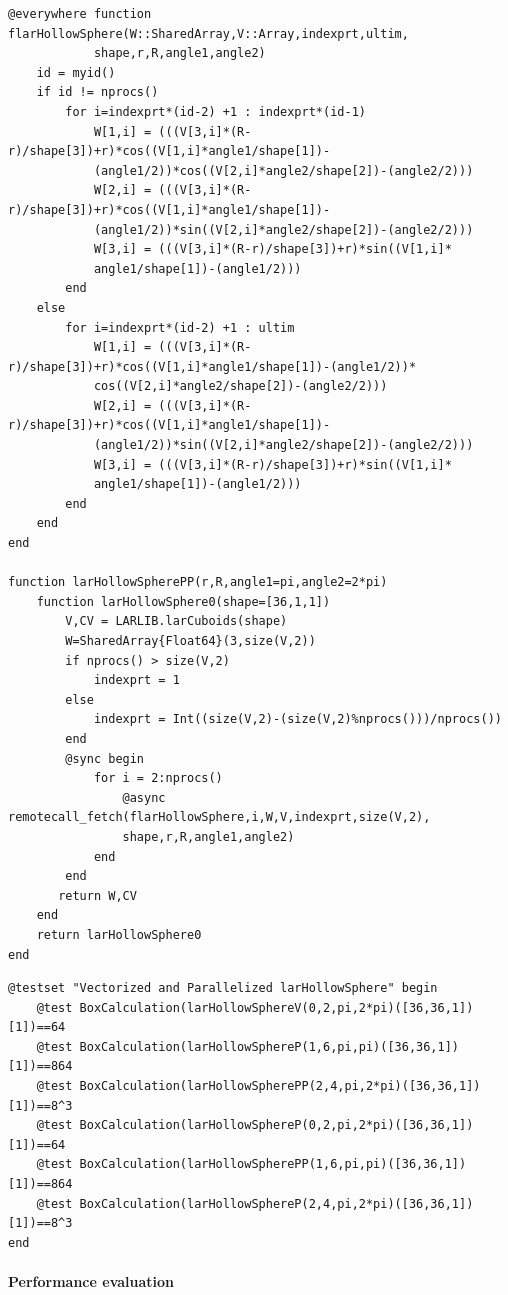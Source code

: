 \documentclass{article}
\begin{document}
\begin{Verbatim}
@everywhere function flarHollowSphere(W::SharedArray,V::Array,indexprt,ultim,
            shape,r,R,angle1,angle2)
    id = myid()
    if id != nprocs()
        for i=indexprt*(id-2) +1 : indexprt*(id-1)
            W[1,i] = (((V[3,i]*(R-r)/shape[3])+r)*cos((V[1,i]*angle1/shape[1])-
            (angle1/2))*cos((V[2,i]*angle2/shape[2])-(angle2/2)))
            W[2,i] = (((V[3,i]*(R-r)/shape[3])+r)*cos((V[1,i]*angle1/shape[1])-
            (angle1/2))*sin((V[2,i]*angle2/shape[2])-(angle2/2)))
            W[3,i] = (((V[3,i]*(R-r)/shape[3])+r)*sin((V[1,i]*
            angle1/shape[1])-(angle1/2)))
        end
    else
        for i=indexprt*(id-2) +1 : ultim
            W[1,i] = (((V[3,i]*(R-r)/shape[3])+r)*cos((V[1,i]*angle1/shape[1])-(angle1/2))*
            cos((V[2,i]*angle2/shape[2])-(angle2/2)))
            W[2,i] = (((V[3,i]*(R-r)/shape[3])+r)*cos((V[1,i]*angle1/shape[1])-
            (angle1/2))*sin((V[2,i]*angle2/shape[2])-(angle2/2)))
            W[3,i] = (((V[3,i]*(R-r)/shape[3])+r)*sin((V[1,i]*
            angle1/shape[1])-(angle1/2)))
        end
    end
end

function larHollowSpherePP(r,R,angle1=pi,angle2=2*pi)
    function larHollowSphere0(shape=[36,1,1])
        V,CV = LARLIB.larCuboids(shape)
        W=SharedArray{Float64}(3,size(V,2))
        if nprocs() > size(V,2)
            indexprt = 1
        else
            indexprt = Int((size(V,2)-(size(V,2)%nprocs()))/nprocs())
        end
        @sync begin
            for i = 2:nprocs()
                @async remotecall_fetch(flarHollowSphere,i,W,V,indexprt,size(V,2),
                shape,r,R,angle1,angle2)
            end
        end
       return W,CV
    end
    return larHollowSphere0
end
\end{Verbatim}

\begin{Verbatim}
@testset "Vectorized and Parallelized larHollowSphere" begin
    @test BoxCalculation(larHollowSphereV(0,2,pi,2*pi)([36,36,1])[1])==64
    @test BoxCalculation(larHollowSphereP(1,6,pi,pi)([36,36,1])[1])==864
    @test BoxCalculation(larHollowSpherePP(2,4,pi,2*pi)([36,36,1])[1])==8^3
    @test BoxCalculation(larHollowSphereP(0,2,pi,2*pi)([36,36,1])[1])==64
    @test BoxCalculation(larHollowSpherePP(1,6,pi,pi)([36,36,1])[1])==864
    @test BoxCalculation(larHollowSphereP(2,4,pi,2*pi)([36,36,1])[1])==8^3
end
\end{Verbatim}

\paragraph{Performance evaluation}
\end{document}
